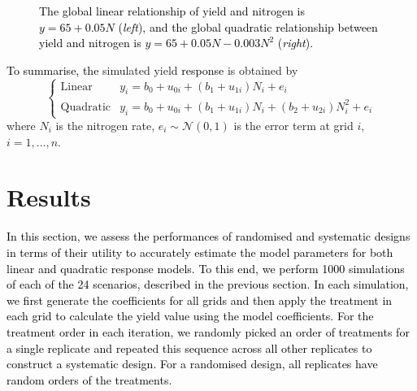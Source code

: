 \documentclass[a4paper]{article} 	%
\newcommand{\N}{\mathcal{N}}
\newcommand{\revision}[1]{\textcolor{black}{#1}}
\newcommand{\zc}[1]{\textcolor{black}{#1}}
\begin{document}
\begin{figure}[H]
\begin{subfigure}[t]{0.45\textwidth}
 \end{subfigure}
	\caption{\revision{The global linear relationship of yield and nitrogen is $y=65+0.05N$ (\textit{left}), and the global quadratic relationship between yield and nitrogen is $y=65+0.05N-0.003N^2$ (\textit{right}).}}\label{fig:Lines}
\end{figure}


\zc{To summarise, the} simulated yield \revision{response} is obtained by 
\begin{equation}
\begin{cases}
	\text{Linear}  &y_i = b_0 + u_{0i} + (b_1 + u_{1i})N_i + e_i \\
	\text{Quadratic} &y_i = b_0 + u_{0i} + (b_1 + u_{1i})N_i + (b_2 + u_{2i})N_i^2 + e_i
\end{cases}
\end{equation}
where $N_i$ is the nitrogen rate, $e_i\sim \N(0,1)$ is the error term at grid $i$, $i = 1, \ldots, n$. 



\section{Results}\label{Sec:Res}

\revision{In this section, we assess the performances of randomised and systematic designs in terms of their utility to accurately estimate the model parameters for both linear and quadratic response models. To this end, we perform 1000 simulations of each \revision{of the 24} scenarios\zc{, described} in the previous section.} \zc{In each simulation, we first generate the coefficients for all grids and then apply the treatment in each grid to calculate the yield value using the model coefficients. For the treatment order in each iteration, we randomly picked an order of treatments for a single replicate and repeated this sequence across all other replicates to construct a systematic design. For a randomised design, all replicates have random orders of the treatments.}

\end{document}
